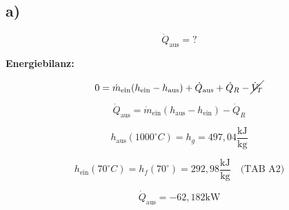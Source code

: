 

\subsection*{a)}

\[
\dot{Q}_{\text{aus}} = ?
\]

\textbf{Energiebilanz:}

\[
0 = \dot{m}_{\text{ein}} (h_{\text{ein}} - h_{\text{aus}}) + \dot{Q}_{\text{aus}} + \dot{Q}_R - \cancel{\dot{V}_T}
\]

\[
\dot{Q}_{\text{aus}} = \dot{m}_{\text{ein}} (h_{\text{aus}} - h_{\text{ein}}) - \dot{Q}_R
\]

\[
h_{\text{aus}} (1000^\circ C) = h_g = 497,04 \frac{\text{kJ}}{\text{kg}}
\]

\[
h_{\text{ein}} (70^\circ C) = h_f (70^\circ) = 292,98 \frac{\text{kJ}}{\text{kg}} \quad \text{(TAB A2)}
\]

\[
\dot{Q}_{\text{aus}} = -62,182 \text{kW}
\]


